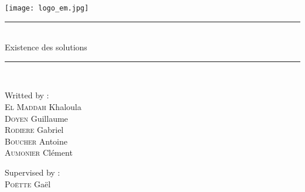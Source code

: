 \documentclass[onecolumn, 12pt, a4paper]{article}
\begin{document}
    \begin{center}


    \vspace{50pt}
    \texttt{[image: logo\_em.jpg]}\\
    \vspace{20pt}
    
    \rule{1\textwidth}{2pt}\\
    \vspace{20pt}
    \huge Existence des solutions\\
    \vspace{20pt}
    \rule{1\textwidth}{2pt}\\ 
    \vspace{10pt}

    \end{center}

    \noindent
    \begin{minipage}{0.5\textwidth}
        \begin{flushleft}
            \Large Writted by :\\[0.2cm]
            \textsc{El Maddah} Khaloula\\
            \textsc{Doyen} Guillaume\\
            \textsc{Rodiere} Gabriel\\
            \textsc{Boucher} Antoine\\
            \textsc{Aumonier} Clément\\
        \end{flushleft}
    \end{minipage}%
    \begin{minipage}{0.5\textwidth}
        \begin{flushright}
                \Large Supervised by :\\[0.2cm]
                \textsc{Poëtte} Gaël\\

        \end{flushright}
    \end{minipage}
 
	\vspace{50 pt}
 


 

\newpage
\footnotesize

\tableofcontents
\setcounter{tocdepth}{1}
\setcounter{tocdepth}{0}
\def\restriction#1#2{\mathchoice
	{\setbox1\hbox{${\displaystyle #1}_{\scriptstyle #2}$}
		\restrictionaux{#1}{#2}}
	{\setbox1\hbox{${\textstyle #1}_{\scriptstyle #2}$}
		\restrictionaux{#1}{#2}}
	{\setbox1\hbox{${\scriptstyle #1}_{\scriptscriptstyle #2}$}
		\restrictionaux{#1}{#2}}
	{\setbox1\hbox{${\scriptscriptstyle #1}_{\scriptscriptstyle #2}$}
		\restrictionaux{#1}{#2}}}
\def\restrictionaux#1#2{{#1\,\smash{\vrule height .8\ht1 depth .85\dp1}}_{\,#2}} 
\end{document}
